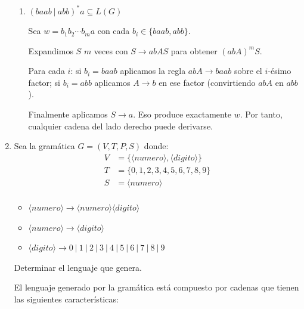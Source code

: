 \documentclass[12pt]{report} %
\begin{document}
\begin{enumerate}
\begin{solucion}[Ejercicio 2.a]
\begin{enumerate}
           \item $(baab \ | \ abb)^* a \subseteq L(G)$

               Sea $w = b_1b_2\cdots b_ma$ con cada $b_i \in \{baab, abb\}$.

               Expandimos $S$ $m$ veces con $S \to abAS$ para obtener $(abA)^mS$.

               Para cada $i$: si $b_i = baab$ aplicamos la regla $abA \to baab$ sobre el $i$-ésimo factor; si $b_i = abb$ aplicamos $A \to b$ en ese factor (convirtiendo $abA$ en $abb$).

               Finalmente aplicamos $S \to a$. Eso produce exactamente $w$. Por tanto, cualquier cadena del lado derecho puede derivarse.
       \end{enumerate}

   \end{solucion}
\item
  Sea la gramática \(G = (V, T, P, S)\) donde:\\
  \begin{align*}
   V &= \{\langle numero \rangle, \langle digito \rangle\} \\
   T &= \{0, 1, 2, 3, 4, 5, 6, 7, 8, 9\} \\
   S &= \langle numero \rangle \\
   \end{align*}

  \begin{itemize}
       \item $\langle numero \rangle \to \langle numero \rangle \langle digito \rangle$
       \item $\langle numero \rangle \to \langle digito \rangle$
       \item $\langle digito \rangle \to 0 \ | \ 1 \ | \ 2 \ | \ 3 \ | \ 4 \ | \ 5 \ | \ 6 \ | \ 7 \ | \ 8 \ | \ 9$
   \end{itemize}

  Determinar el lenguaje que genera.

  \begin{solucion}[Ejercicio 2.b]

   El lenguaje generado por la gramática está compuesto por cadenas que tienen las siguientes características:


\end{solucion}
\end{enumerate}
\end{document}
